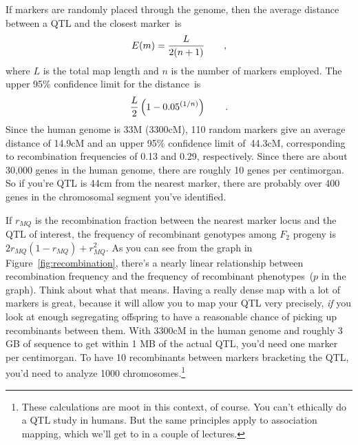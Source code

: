 \documentclass[12pt]{article}
\begin{document}
If markers are randomly placed through the genome, then the average
distance between a QTL and the closest marker~is
\[
E(m) = {L \over 2(n+1)} \qquad ,
\]
where $L$ is the total map length and $n$ is the number of markers
employed. The upper 95\% confidence limit for the distance~is
\[
{L \over 2}\left(1 - 0.05^{(1/n)}\right) \qquad .
\]
Since the human genome is 33M (3300cM), 110 random markers give an
average distance of 14.9cM and an upper 95\% confidence limit
of~44.3cM, corresponding to recombination frequencies of 0.13 and
0.29, respectively. Since there are about 30,000 genes in the human
genome, there are roughly 10 genes per centimorgan. So if you're QTL
is 44cm from the nearest marker, there are probably over 400 genes in
the chromosomal segment you've identified.

If $r_{MQ}$ is the recombination fraction between the nearest marker
locus and the QTL of interest, the frequency of recombinant genotypes
among $F_2$ progeny is $2r_{MQ}(1-r_{MQ}) + r_{MQ}^2$. As you can see
from the graph in Figure~\ref{fig:recombination}, there's a nearly
linear relationship between recombination frequency and the frequency
of recombinant phenotypes~($p$ in the graph). Think about what that
means. Having a really dense map with a lot of markers is great,
because it will allow you to map your QTL very precisely, {\it if} you
look at enough segregating offspring to have a reasonable chance of
picking up recombinants between them. With 3300cM in the human genome
and roughly 3 GB of sequence to get within 1 MB of the actual QTL,
you'd need one marker per centimorgan. To have 10 recombinants between
markers bracketing the QTL, you'd need to analyze 1000
chromosomes.\footnote{These calculations are moot in this context, of
  course. You can't ethically do a QTL study in humans. But the same
  principles apply to association mapping, which we'll get to in a
  couple of lectures.}
\end{document}

